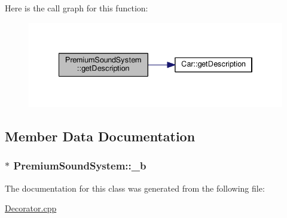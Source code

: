 Here is the call graph for this function\+:
\nopagebreak
\begin{figure}[H]
\begin{center}
\leavevmode
\includegraphics[width=334pt]{classPremiumSoundSystem_a11267003bbf024bf19b811b0b28b22c1_cgraph}
\end{center}
\end{figure}




\subsection{Member Data Documentation}
\subsubsection[{\texorpdfstring{\+\_\+b}{_b}}]{$\ast$ Premium\+Sound\+System\+::\+\_\+b\hspace{0.3cm}{\ttfamily [private]}}\hypertarget{classPremiumSoundSystem_a441bc8062467c6c45cd47bca4b8950dd}{}\label{classPremiumSoundSystem_a441bc8062467c6c45cd47bca4b8950dd}


The documentation for this class was generated from the following file\+:\begin{DoxyCompactItemize}
\item 
\hyperlink{Decorator_8cpp}{Decorator.\+cpp}\end{DoxyCompactItemize}
